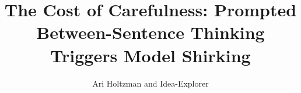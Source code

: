 \documentclass{article}
\title{The Cost of Carefulness: Prompted Between-Sentence Thinking Triggers Model Shirking}
\author{Ari Holtzman and Idea-Explorer}
\begin{document}
\maketitle

\begin{abstract}

\end{abstract}









\end{document}
